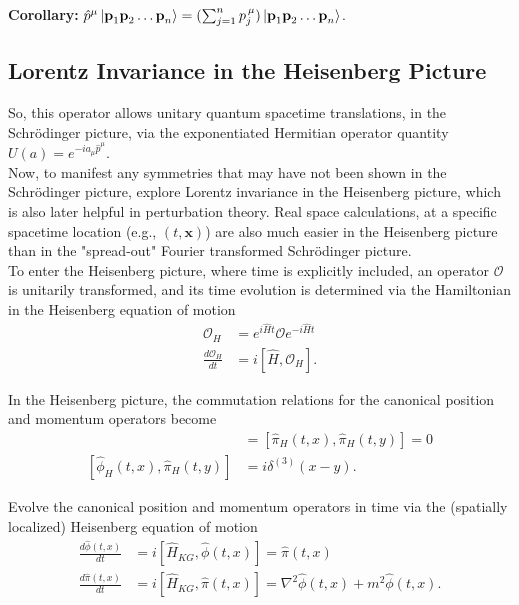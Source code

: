 \noindent \textbf{Corollary:} $\hat{p}^\mu \ket{\textbf{p}_1 \textbf{p}_2 \dots \textbf{p}_n} = ( \sum_{j=1}^n p_j^{\, \mu} ) \ket{\textbf{p}_1 \textbf{p}_2 \dots \textbf{p}_n} $. \\

\subsection*{Lorentz Invariance in the Heisenberg Picture}

\noindent So, this operator allows unitary quantum spacetime translations, in the Schr\"odinger picture, via the exponentiated Hermitian operator quantity $U(a) = e^{-i a_\mu \hat{p}^\mu}$. \\

\noindent Now, to manifest any symmetries that may have not been shown in the Schr\"odinger picture, explore Lorentz invariance in the Heisenberg picture, which is also later helpful in perturbation theory. Real space calculations, at a specific spacetime location (e.g., $(t,\textbf{x})$) are also much easier in the Heisenberg picture than in the "spread-out" Fourier transformed Schr\"odinger picture.\\

\noindent To enter the Heisenberg picture, where time is explicitly included, an operator $\mathcal{O}$ is unitarily transformed, and its time evolution is determined via the Hamiltonian in the Heisenberg equation of motion
\begin{align}
\mathcal{O}_H &= e^{i \hat{H} t} \mathcal{O} e^{-i \hat{H} t} \\
\frac{d \mathcal{O}_H}{d t} &= i [ \hat{H}, \mathcal{O}_H ].
\end{align}

\noindent In the Heisenberg picture, the commutation relations for the canonical position and momentum operators become
\begin{align}
[ \hat{\phi}_H(t, x), \hat{\phi}_H(t, y) ] &= [ \hat{\pi}_H(t, x), \hat{\pi}_H(t, y) ] = 0 \\
[ \hat{\phi}_H(t, x), \hat{\pi}_H(t, y) ] &= i \delta^{(3)}(x - y).
\end{align}

\noindent Evolve the canonical position and momentum operators in time via the (spatially localized) Heisenberg equation of motion
\begin{align}
\frac{d \hat{\phi}(t, x)}{d t} &= i [ \hat{H}_{KG}, \hat{\phi}(t, x)] = \hat{\pi}(t, x) \\
\frac{d \hat{\pi}(t, x)}{d t} &= i [ \hat{H}_{KG}, \hat{\pi}(t, x)] = \nabla^2 \hat{\phi}(t, x) + m^2 \hat{\phi}(t, x).
\end{align}

